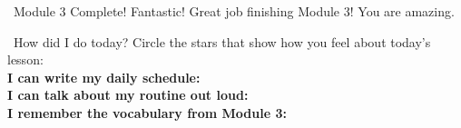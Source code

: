 \vspace{1em}
\begin{grammartip}{ \ Module 3 Complete! Fantastic!}
  Great job finishing Module 3! You are amazing.
\end{grammartip}

\vspace{1em}
\begin{grammartip}{ \ How did I do today?}
  Circle the stars that show how you feel about today's lesson:\\[6pt]
  \textbf{I can write my daily schedule:} \selfcheck[0] \\[4pt]
  \textbf{I can talk about my routine out loud:} \selfcheck[0] \\[4pt]
  \textbf{I remember the vocabulary from Module 3:} \selfcheck[0]
\end{grammartip}

